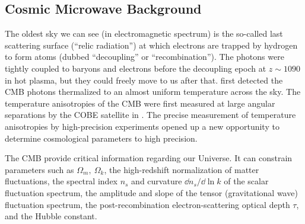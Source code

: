 \subsection{Cosmic Microwave Background}
The oldest sky we can see (in electromagnetic spectrum) is the so-called last scattering surface (``relic radiation'') at which electrons are trapped by hydrogen to form atoms (dubbed ``decoupling'' or ``recombination''). The photons were tightly coupled to baryons and electrons before the decoupling epoch at $z\sim1090$ in hot plasma, but they could freely move to us after that. \textcite{1965ApJ...142..419P} first detected the CMB photons thermalized to an almost uniform temperature across the sky. The temperature anisotropies of the CMB were first measured at large angular separations by the COBE satellite in \textcite{1992ApJ...396L...1S}. The precise measurement of temperature anisotropies by high-precision experiments \parencite[e.g.][]{2003ApJS..148..175S} opened up a new opportunity to determine cosmological parameters to high precision.

The CMB provide critical information regarding our Universe. It can constrain parameters such as $\Omega_m,\ \Omega_k$, the high-redshift normalization of matter fluctuations, the spectral index $n_s$ and curvature $\dd n_s/\dd \ln k$ of the scalar fluctuation spectrum, the amplitude and slope of the tensor (gravitational wave) fluctuation spectrum, the post-recombination electron-scattering optical depth $\tau$, and the Hubble constant.

